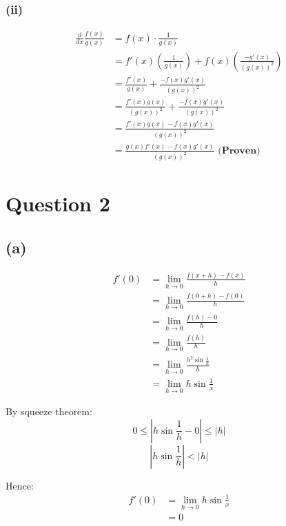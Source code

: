 \documentclass[11pt]{article}
\begin{document}
\subsubsection{(ii)}
\label{sec:orgb3e67a7}

\begin{align*}
\frac{d}{dx} \frac{f(x)}{g(x)} &= f(x) \cdot \frac{1}{g(x)} \\
&= f'(x) \left( \frac{1}{g(x)} \right) + f(x) \left( \frac{-g'(x)}{(g(x))^2} \right) \\
&= \frac{f'(x)}{g(x)} + \frac{-f(x)g'(x)}{(g(x))^2} \\
&= \frac{f'(x)g(x)}{(g(x))^2} + \frac{-f(x)g'(x)}{(g(x))^2} \\
&= \frac{f'(x)g(x) - f(x) g'(x)}{(g(x))^2} \\
&= \frac{g(x) f'(x) - f(x) g'(x)}{(g(x))^2} \textbf{ (Proven)}
\end{align*}

\newpage

\section{Question 2}
\label{sec:org8bc0e35}

\subsection{(a)}
\label{sec:orgf290d8e}

\begin{align*}
f'(0) &= \lim_{h \rightarrow 0} \frac{f(x + h) - f(x)}{h} \\
&= \lim_{h \rightarrow 0} \frac{f(0 + h) - f(0)}{h} \\
&= \lim_{h \rightarrow 0} \frac{f(h) - 0}{h} \\
&= \lim_{h \rightarrow 0} \frac{f(h)}{h} \\
&= \lim_{h \rightarrow 0} \frac{h^2 \sin \frac{1}{h}}{h} \\
&= \lim_{h \rightarrow 0} h \sin \frac{1}{x}
\end{align*}

By squeeze theorem:
\[0 \le \left|h \sin \frac{1}{h} - 0 \right| \le |h|\]
\[\left|h \sin \frac{1}{h}\right| < |h|\]

Hence:
\begin{align*}
f'(0) &= \lim_{h \rightarrow 0} h \sin \frac{1}{x} \\
&= 0
\end{align*}

\newpage
\end{document}
